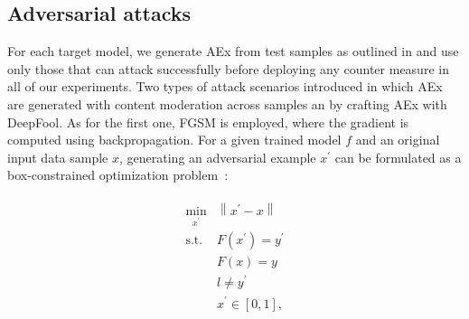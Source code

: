 \subsection{Adversarial attacks}
For each target model, we generate AEx from test samples as outlined in  and use only those that can attack successfully before deploying any counter measure in all of our experiments. 
Two types of attack scenarios introduced in which AEx are generated with content moderation across samples an by crafting AEx with DeepFool.
As for the first one, FGSM is employed, where the gradient is computed using backpropagation. For a given trained model $f$ and an original input data sample $x$, generating an adversarial example $x^{\prime}$ can be formulated as a box-constrained optimization problem~\cite{yuan2019adversarial}:

\vspace{-6mm}
\begin{align}
    \begin{array}{cl}
        \min _{x^{\prime}} & \left\|x^{\prime}-x\right\| \\
        \text {s.t.} & F\left(x^{\prime}\right)=y^{\prime} \\
        & F(x)=y \\
        & l \neq y^{\prime} \\
        & x^{\prime} \in[0,1],
    \end{array}
\end{align}

